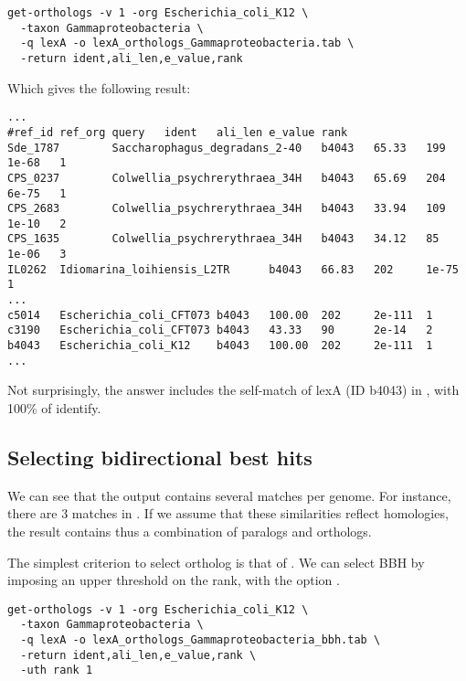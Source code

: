 \begin{small}
\begin{verbatim}
get-orthologs -v 1 -org Escherichia_coli_K12 \
  -taxon Gammaproteobacteria \
  -q lexA -o lexA_orthologs_Gammaproteobacteria.tab \
  -return ident,ali_len,e_value,rank 
\end{verbatim}
\end{small}

Which gives the following result:

\begin{scriptsize}
\begin{verbatim}
...
#ref_id ref_org query   ident   ali_len e_value rank
Sde_1787        Saccharophagus_degradans_2-40   b4043   65.33   199     1e-68   1
CPS_0237        Colwellia_psychrerythraea_34H   b4043   65.69   204     6e-75   1
CPS_2683        Colwellia_psychrerythraea_34H   b4043   33.94   109     1e-10   2
CPS_1635        Colwellia_psychrerythraea_34H   b4043   34.12   85      1e-06   3
IL0262  Idiomarina_loihiensis_L2TR      b4043   66.83   202     1e-75   1
...
c5014   Escherichia_coli_CFT073 b4043   100.00  202     2e-111  1
c3190   Escherichia_coli_CFT073 b4043   43.33   90      2e-14   2
b4043   Escherichia_coli_K12    b4043   100.00  202     2e-111  1
...
\end{verbatim}
\end{scriptsize}

Not surprisingly, the answer includes the self-match of lexA (ID
b4043) in , with 100\% of identify.

\subsection{Selecting bidirectional best hits}

We can see that the output contains several matches per genome. For
instance, there are 3 matches in . If we assume that these similarities reflect homologies, the
result contains thus a combination of paralogs and orthologs. 

The simplest criterion to select ortholog is that of
\concept{bidirectional best hit (BBH)}. We can select BBH by imposing
an upper threshold on the rank, with the option .

\begin{small}
\begin{verbatim}
get-orthologs -v 1 -org Escherichia_coli_K12 \
  -taxon Gammaproteobacteria \
  -q lexA -o lexA_orthologs_Gammaproteobacteria_bbh.tab \
  -return ident,ali_len,e_value,rank \
  -uth rank 1 
\end{verbatim}
\end{small}

